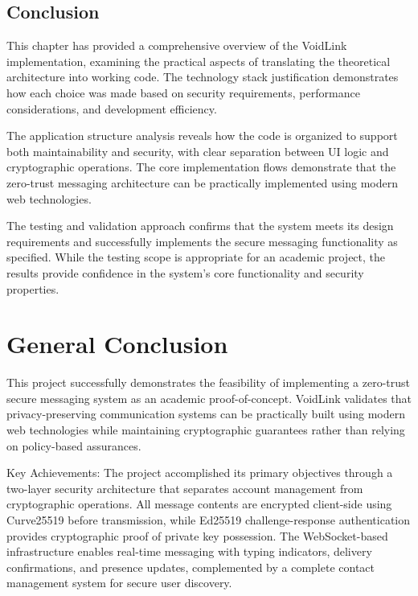 \documentclass[12pt,a4paper,openany]{book}
\begin{document}
\section{Conclusion}

This chapter has provided a comprehensive overview of the VoidLink implementation, examining the practical aspects of translating the theoretical architecture into working code. The technology stack justification demonstrates how each choice was made based on security requirements, performance considerations, and development efficiency.

The application structure analysis reveals how the code is organized to support both maintainability and security, with clear separation between UI logic and cryptographic operations. The core implementation flows demonstrate that the zero-trust messaging architecture can be practically implemented using modern web technologies.

The testing and validation approach confirms that the system meets its design requirements and successfully implements the secure messaging functionality as specified. While the testing scope is appropriate for an academic project, the results provide confidence in the system's core functionality and security properties.

\newpage
\chapter*{General Conclusion}
\thispagestyle{plain}

This project successfully demonstrates the feasibility of implementing a zero-trust secure messaging system as an academic proof-of-concept. VoidLink validates that privacy-preserving communication systems can be practically built using modern web technologies while maintaining cryptographic guarantees rather than relying on policy-based assurances.

Key Achievements: The project accomplished its primary objectives through a two-layer security architecture that separates account management from cryptographic operations. All message contents are encrypted client-side using Curve25519 before transmission, while Ed25519 challenge-response authentication provides cryptographic proof of private key possession. The WebSocket-based infrastructure enables real-time messaging with typing indicators, delivery confirmations, and presence updates, complemented by a complete contact management system for secure user discovery.
\end{document}

